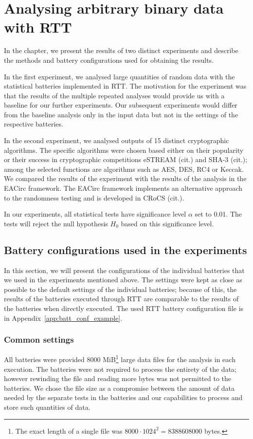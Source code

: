 \documentclass[
  digital,  	%
  color,		%
  oneside,   	%
  12pt,
  nocover,
  notable,
  nolof,
  nolot,
]{fithesis3}
\theoremstyle{definition}
\theoremstyle{remark}
\begin{document}
\chapter{Analysing arbitrary binary data with RTT}
\label{chap:crypto_fn_analysis}

In the chapter, we present the results of two distinct experiments and describe the methods and battery configurations used for obtaining the results.

In the first experiment, we analysed large quantities of random data with the statistical batteries implemented in RTT. The motivation for the experiment was that the results of the multiple repeated analyses would provide us with a baseline for our further experiments. Our subsequent experiments would differ from the baseline analysis only in the input data but not in the settings of the respective batteries.

In the second experiment, we analysed outputs of 15 distinct cryptographic algorithms. The specific algorithms were chosen based either on their popularity or their success in cryptographic competitions eSTREAM (cit.) and SHA-3 (cit.); among the selected functions are algorithms such as AES, DES, RC4 or Keccak. We compared the results of the experiment with the results of the analysis in the EACirc framework. The EACirc framework implements an alternative approach to the randomness testing and is developed in CRoCS (cit.).

In our experiments, all statistical tests have significance level $\alpha$ set to 0.01. The tests will reject the null hypothesis $H_0$ based on this significance level.

\section{Battery configurations used in the experiments}
\label{sec:configuration_of_batteries}
In this section, we will present the configurations of the individual batteries that we used in the experiments mentioned above. The settings were kept as close as possible to the default settings of the individual batteries; because of this, the results of the batteries executed through RTT are comparable to the results of the batteries when directly executed. The used RTT battery configuration file is in Appendix~\ref{app:batt_conf_example}.

\subsection{Common settings}
All batteries were provided 8000 MiB\footnote{The exact length of a single file was $8000 \cdot 1024^2 = 8388608000$ bytes.} large data files for the analysis in each execution. The batteries were not required to process the entirety of the data; however rewinding the file and reading more bytes was not permitted to the batteries. We chose the file size as a compromise between the amount of data needed by the separate tests in the batteries and our capabilities to process and store such quantities of data.
\end{document}
